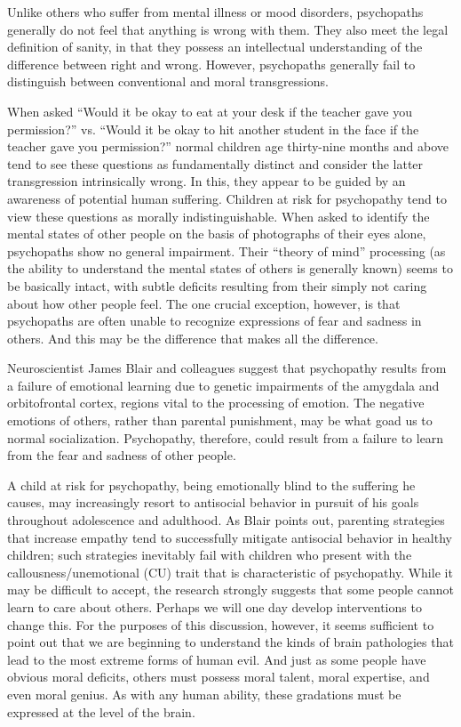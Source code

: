 \documentclass[a4paper,14pt]{extbook}
\begin{document}
Unlike others who suffer from mental illness or mood disorders, psychopaths generally do not feel that anything is wrong with them.
They also meet the legal definition of sanity, in that they possess an intellectual understanding of the difference between right and wrong.
However, psychopaths generally fail to distinguish between conventional and moral transgressions.

When asked ``Would it be okay to eat at your desk if the teacher gave you permission?'' vs. ``Would it be okay to hit another student in the face if the teacher gave you permission?'' normal children age thirty-nine months and above tend to see these questions as fundamentally distinct and consider the latter transgression intrinsically wrong.
In this, they appear to be guided by an awareness of potential human suffering.
Children at risk for psychopathy tend to view these questions as morally indistinguishable.
When asked to identify the mental states of other people on the basis of photographs of their eyes alone, psychopaths show no general impairment.
Their ``theory of mind'' processing (as the ability to understand the mental states of others is generally known) seems to be basically intact, with subtle deficits resulting from their simply not caring about how other people feel.
The one crucial exception, however, is that psychopaths are often unable to recognize expressions of fear and sadness in others.
And this may be the difference that makes all the difference.

Neuroscientist James Blair and colleagues suggest that psychopathy results from a failure of emotional learning due to genetic impairments of the amygdala and orbitofrontal cortex, regions vital to the processing of emotion.
The negative emotions of others, rather than parental punishment, may be what goad us to normal socialization.
Psychopathy, therefore, could result from a failure to learn from the fear and sadness of other people.

A child at risk for psychopathy, being emotionally blind to the suffering he causes, may increasingly resort to antisocial behavior in pursuit of his goals throughout adolescence and adulthood.
As Blair points out, parenting strategies that increase empathy tend to successfully mitigate antisocial behavior in healthy children;
such strategies inevitably fail with children who present with the callousness/unemotional (CU) trait that is characteristic of psychopathy.
While it may be difficult to accept, the research strongly suggests that some people cannot learn to care about others.
Perhaps we will one day develop interventions to change this.
For the purposes of this discussion, however, it seems sufficient to point out that we are beginning to understand the kinds of brain pathologies that lead to the most extreme forms of human evil.
And just as some people have obvious moral deficits, others must possess moral talent, moral expertise, and even moral genius.
As with any human ability, these gradations must be expressed at the level of the brain.
\end{document}
